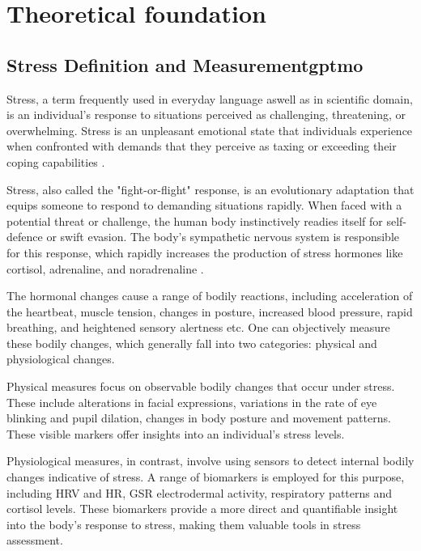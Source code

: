 \chapter{Theoretical foundation}

\section{Stress Definition and Measurement\gls{gptmo}}
Stress, a term frequently used in everyday language aswell as in scientific domain, is an individual's response to situations perceived as challenging, threatening, or overwhelming. Stress is an unpleasant emotional state that individuals experience when confronted with demands that they perceive as taxing or exceeding their coping capabilities \parencite{stress2}.

Stress, also called the "fight-or-flight" response, is an evolutionary adaptation that equips someone to respond to demanding situations rapidly. When faced with a potential threat or challenge, the human body instinctively readies itself for self-defence or swift evasion. The body's sympathetic nervous system is responsible for this response, which rapidly increases the production of stress hormones like cortisol, adrenaline, and noradrenaline \parencite{1}.

The hormonal changes cause a range of bodily reactions, including acceleration of the heartbeat, muscle tension, changes in posture, increased blood pressure, rapid breathing, and heightened sensory alertness etc. One can objectively measure these bodily changes, which generally fall into two categories: physical and physiological changes.

Physical measures focus on observable bodily changes that occur under stress. These include alterations in facial expressions, variations in the rate of eye blinking and pupil dilation, changes in body posture and movement patterns. These visible markers offer insights into an individual's stress levels.

Physiological measures, in contrast, involve using sensors to detect internal bodily changes indicative of stress. A range of biomarkers is employed for this purpose, including \gls{HRV}  and \gls{HR}, \gls{GSR} electrodermal activity, respiratory patterns and cortisol levels. These biomarkers provide a more direct and quantifiable insight into the body's response to stress, making them valuable tools in stress assessment.

